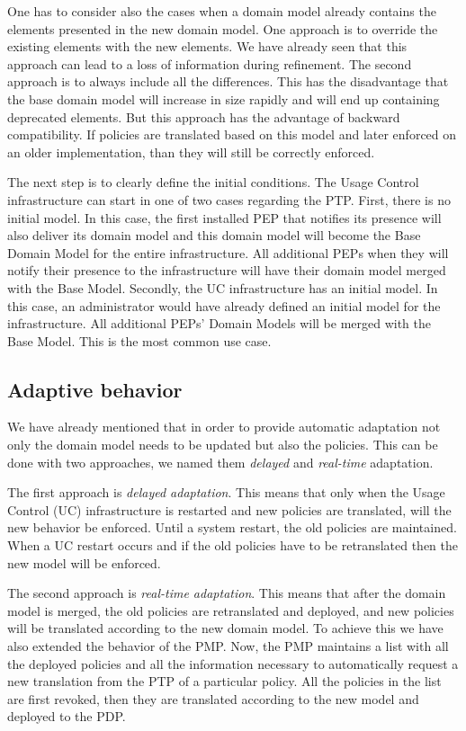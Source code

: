 \documentclass{sig-alternate}
\begin{document}
One has to consider also the cases when a domain model already contains the elements presented in the new domain model.
One approach is to override the existing elements with the new elements.
We have already seen that this approach can lead to a loss of information during refinement.
The second approach is to always include all the differences.
This has the disadvantage that the base domain model will increase in size rapidly and will end up containing deprecated elements.
But this approach has the advantage of backward compatibility. 
If policies are translated based on this model and later enforced on an older implementation, than they will still be correctly enforced.

The next step is to clearly define the initial conditions. 
The Usage Control infrastructure can start in one of two cases regarding the PTP. 
First, there is no initial model. In this case, the first installed PEP that notifies its presence will also deliver its domain model 
and this domain model will become the Base Domain Model for the entire infrastructure.
All additional PEPs when they will notify their presence to the infrastructure will have their domain model merged with the Base Model.
Secondly, the UC infrastructure has an initial model.
In this case, an administrator would have already defined an initial model for the infrastructure. 
All additional PEPs' Domain Models will be merged with the Base Model. 
This is the most common use case.

\subsection{Adaptive behavior}
We have already mentioned that in order to provide automatic adaptation not only the domain model needs to be updated but also the policies.
This can be done with two approaches, we named them \textit{delayed} and \textit{real-time} adaptation.

The first approach is \textit{delayed adaptation}. This means that only when the Usage Control (UC) infrastructure is restarted and new policies are translated, 
will the new behavior be enforced. Until a system restart, the old policies are maintained. 
When a UC restart occurs and if the old policies have to be retranslated then the new model will be enforced. 

The second approach is \textit{real-time adaptation}. This means that after the domain model is merged, the old policies are retranslated and deployed,
and new policies will be translated according to the new domain model.
To achieve this we have also extended the behavior of the PMP.
Now, the PMP maintains a list with all the deployed policies and all the information necessary to automatically request a new translation from the PTP of a particular policy.
All the policies in the list are first revoked, then they are translated according to the new model and deployed to the PDP.
\end{document}
